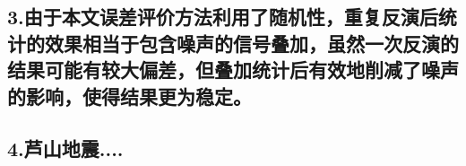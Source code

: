 \documentclass[a4paper,12pt,single,pdftex]{scrartcl}
\begin{document}
\label{ID_279520938}\subsection{3.由于本文误差评价方法利用了随机性，重复反演后统计的效果相当于包含噪声的信号叠加，虽然一次反演的结果可能有较大偏差，但叠加统计后有效地削减了噪声的影响，使得结果更为稳定。}

\label{ID_776523354}\subsection{4.芦山地震....}


\newpage
\end{document}
